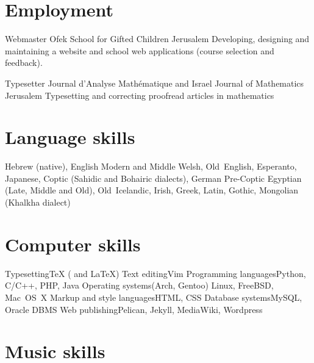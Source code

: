 \section{Employment}

	{Webmaster}
	{Ofek School for Gifted Children}
	{Jerusalem}
	{}
	{Developing, designing and maintaining a website and school web applications (course selection and feedback).}

	{Typesetter}
	{Journal d'Analyse Mathématique and Israel Journal of Mathematics}
	{Jerusalem}
	{}
	{Typesetting and correcting proofread articles in mathematics}



\section{Language skills}

	{Hebrew (native), English}
	{Modern and Middle Welsh, Old~English, Esperanto, Japanese, Coptic (Sahidic and Bohairic dialects), German}
	{Pre-Coptic Egyptian (Late, Middle and Old), Old~Icelandic, Irish, Greek, Latin, Gothic, Mongolian (Khalkha dialect)}



\section{Computer skills}

\cvdoubleitem
	{Typesetting}{{\texfont\TeX} ({\texfont\XeLaTeX} and {\texfont\LaTeX})}
	{Text editing}{Vim}
\cvdoubleitem
	{Programming languages}{Python, C/C++, PHP, Java}
	{Operating systems}{(Arch, Gentoo) Linux, FreeBSD, Mac~OS~X}
\cvdoubleitem
	{Markup and style languages}{HTML, CSS}
	{Database systems}{MySQL, Oracle DBMS}
\cvdoubleitem
	{Web publishing}{Pelican, Jekyll, MediaWiki, Wordpress}
	{}{}


\section{Music skills}



